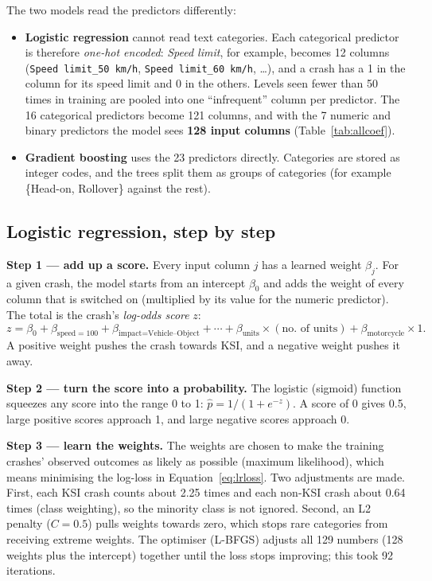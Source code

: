 \documentclass[11pt,a4paper]{article}
\begin{document}
The two models read the predictors differently:
\begin{itemize}
  \item \textbf{Logistic regression} cannot read text categories. Each categorical predictor is therefore
        \emph{one-hot encoded}: \emph{Speed limit}, for example, becomes 12 columns (\texttt{Speed limit\_50 km/h},
        \texttt{Speed limit\_60 km/h}, \ldots), and a crash has a 1 in the column for its speed limit and 0 in the others.
        Levels seen fewer than 50 times in training are pooled into one \enquote{infrequent} column per predictor.
        The 16 categorical predictors become 121 columns, and with the 7 numeric and binary predictors the model sees
        \textbf{128 input columns} (Table~\ref{tab:allcoef}).
  \item \textbf{Gradient boosting} uses the 23 predictors directly. Categories are stored as integer codes, and the
        trees split them as groups of categories (for example \{Head-on, Rollover\} against the rest).
\end{itemize}

\subsection{Logistic regression, step by step}
\label{app:lr}

\textbf{Step 1 --- add up a score.} Every input column $j$ has a learned weight $\beta_j$. For a given crash, the model
starts from an intercept $\beta_0$ and adds the weight of every column that is switched on (multiplied by its value
for the numeric predictor). The total is the crash's \emph{log-odds score} $z$:
\[
  z = \beta_0 + \beta_{\text{speed}=100} + \beta_{\text{impact}=\text{Vehicle--Object}} + \cdots + \beta_{\text{units}} \times (\text{no.\ of units}) + \beta_{\text{motorcycle}} \times 1 .
\]
A positive weight pushes the crash towards KSI, and a negative weight pushes it away.

\textbf{Step 2 --- turn the score into a probability.} The logistic (sigmoid) function squeezes any score into the range
0 to 1: $\hat{p} = 1/(1+e^{-z})$. A score of 0 gives 0.5, large positive scores approach 1, and large negative scores
approach 0.

\textbf{Step 3 --- learn the weights.} The weights are chosen to make the training crashes' observed outcomes as likely
as possible (maximum likelihood), which means minimising the log-loss in Equation~\ref{eq:lrloss}. Two adjustments are
made. First, each KSI crash counts about 2.25 times and each non-KSI crash about 0.64 times (class weighting), so the
minority class is not ignored. Second, an L2 penalty ($C=0.5$) pulls weights towards zero, which stops rare categories
from receiving extreme weights. The optimiser (L-BFGS) adjusts all 129 numbers (128 weights plus the intercept)
together until the loss stops improving; this took 92 iterations.
\end{document}
